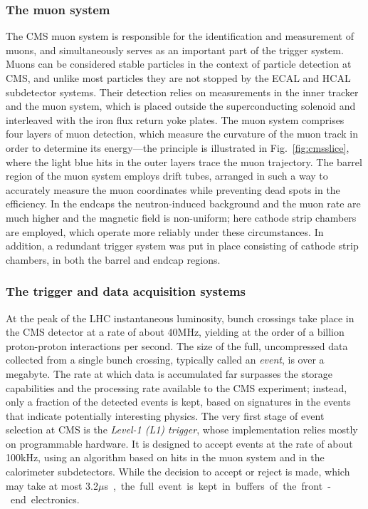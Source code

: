 \subsubsection{The muon system}

The CMS muon system is responsible for the identification and measurement of muons, and simultaneously serves as an important part of the trigger system.
% 
Muons can be considered stable particles in the context of particle detection at CMS, and unlike most particles they are not stopped by the ECAL and HCAL subdetector systems.
% 
Their detection relies on measurements in the inner tracker and the muon system, which is placed outside the superconducting solenoid and interleaved with the iron flux return yoke plates.
% 
The muon system comprises four layers of muon detection, which measure the curvature of the muon track in order to determine its energy---the principle is illustrated in Fig.~\ref{fig:cmsslice}, where the light blue hits in the outer layers trace the muon trajectory.
% 
The barrel region of the muon system employs drift tubes, arranged in such a way to accurately measure the muon coordinates while preventing dead spots in the efficiency.
% 
In the endcaps the neutron-induced background and the muon rate are much higher and the magnetic field is non-uniform; here cathode strip chambers are employed, which operate more reliably under these circumstances.
% 
In addition, a redundant trigger system was put in place consisting of cathode strip chambers, in both the barrel and endcap regions.


\subsubsection{The trigger and data acquisition systems}

At the peak of the LHC instantaneous luminosity, bunch crossings take place in the CMS detector at a rate of about 40\unit{MHz}, yielding at the order of a billion proton-proton interactions per second.
% 
The size of the full, uncompressed data collected from a single bunch crossing, typically called an \textit{event}, is over a megabyte.
% 
The rate at which data is accumulated far surpasses the storage capabilities and the processing rate available to the CMS experiment; instead, only a fraction of the detected events is kept, based on signatures in the events that indicate potentially interesting physics.
% 
The very first stage of event selection at CMS is the \textit{Level-1 (L1) trigger}, whose implementation relies mostly on programmable hardware.
% 
It is designed to accept events at the rate of about 100\unit{kHz}, using an algorithm based on hits in the muon system and in the calorimeter subdetectors.
% 
While the decision to accept or reject is made, which may take at most 3.2\unit{$\mu$s}, the full event is kept in buffers of the front-end electronics.


